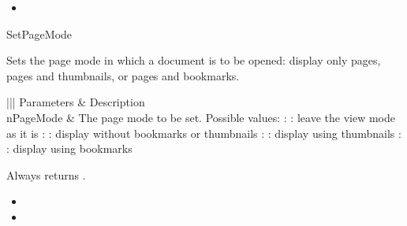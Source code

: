 \documentclass[letterpaper,12pt,english,openany,oneside]{sphinxmanual}
\begin{document}
\label{\detokenize{IAC_API_OLE_Objects:related-methods-110}}
\begin{itemize}
\item {} 
 

\end{itemize}



SetPageMode

Sets the page mode in which a document is to be opened: display only pages, pages and thumbnails, or pages and bookmarks.


\begin{sphinxVerbatim}[commandchars=\\\{\}]
  
\end{sphinxVerbatim}
\label{\detokenize{IAC_API_OLE_Objects:parameters-66}}


\begin{savenotes}\sphinxattablestart
\centering
{}\label{\detokenize{IAC_API_OLE_Objects:section-74}}\nobreak
\begin{tabular}[t]{|||}
\hline
\sphinxstyletheadfamily 
Parameters
&\sphinxstyletheadfamily 
Description
\\
\hline
nPageMode
&
The page mode to be set. Possible values:  : : leave the view mode as it is  : : display without bookmarks or thumbnails  : : display using thumbnails  : : display using bookmarks
\\
\hline
\end{tabular}
\par
\sphinxattableend\end{savenotes}


Always returns .

\label{\detokenize{IAC_API_OLE_Objects:related-methods-111}}
\begin{itemize}
\item {} 
 

\item {} 
 

\end{itemize}
\end{document}
